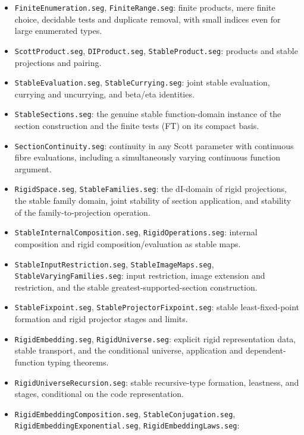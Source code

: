 \documentclass[11pt]{article}
\begin{document}
\begin{itemize}
and finite discrete compact lower ideals; the stable exponential as a
\texttt{DIDomain.DI}.
\item \texttt{FiniteEnumeration.seg}, \texttt{FiniteRange.seg}: finite
products, mere finite choice, decidable tests and duplicate removal,
with small indices even for large enumerated types.
\item \texttt{ScottProduct.seg}, \texttt{DIProduct.seg},
\texttt{StableProduct.seg}: products and stable projections and pairing.
\item \texttt{StableEvaluation.seg}, \texttt{StableCurrying.seg}:
joint stable evaluation, currying and uncurrying, and beta/eta identities.
\item \texttt{StableSections.seg}: the genuine stable function-domain
instance of the section construction and the finite tests (FT) on its
compact basis.
\item \texttt{SectionContinuity.seg}: continuity in any Scott parameter
with continuous fibre evaluations, including a simultaneously varying
continuous function argument.
\item \texttt{RigidSpace.seg}, \texttt{StableFamilies.seg}: the dI-domain
of rigid projections, the stable family domain, joint stability of section
application, and stability of the family-to-projection operation.
\item \texttt{StableInternalComposition.seg}, \texttt{RigidOperations.seg}:
internal composition and rigid composition/evaluation as stable maps.
\item \texttt{StableInputRestriction.seg}, \texttt{StableImageMaps.seg},\\
\texttt{StableVaryingFamilies.seg}: input restriction, image extension and
restriction, and the stable greatest-supported-section construction.
\item \texttt{StableFixpoint.seg}, \texttt{StableProjectorFixpoint.seg}:
stable least-fixed-point formation and rigid projector stages and limits.
\item \texttt{RigidEmbedding.seg}, \texttt{RigidUniverse.seg}:
explicit rigid representation data, stable transport, and the conditional
universe, application and dependent-function typing theorems.
\item \texttt{RigidUniverseRecursion.seg}: stable recursive-type formation,
leastness, and stages, conditional on the code representation.
\item \texttt{RigidEmbeddingComposition.seg}, \texttt{StableConjugation.seg},\\
\texttt{RigidEmbeddingExponential.seg}, \texttt{RigidEmbeddingLaws.seg}:

\end{itemize}
\end{document}
